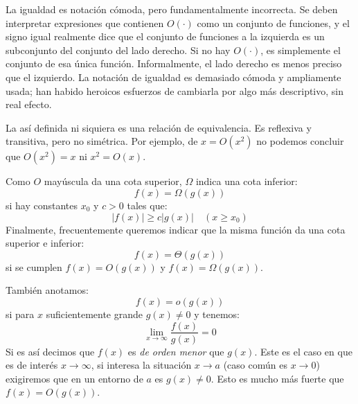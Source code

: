   La igualdad es notación cómoda,
  pero fundamentalmente incorrecta.
  Se deben interpretar expresiones que contienen \(O(\cdot)\)
  como un conjunto de funciones,
  y el signo igual
  realmente dice que el conjunto de funciones a la izquierda
  es un subconjunto del conjunto del lado derecho.
  Si no hay \(O(\cdot)\),
  es simplemente el conjunto de esa única función.
  Informalmente,
  el lado derecho es menos preciso que el izquierdo.
  La notación de igualdad es demasiado cómoda y ampliamente usada;
  han habido heroicos esfuerzos de cambiarla por algo más descriptivo,
  sin real efecto.

  La  así definida
  ni siquiera es una relación de equivalencia.
  Es reflexiva y transitiva,
  pero no simétrica.
  Por ejemplo,
  de \(x = O(x^2)\) no podemos concluir que \(O(x^2) = x\)
  ni \(x^2 = O(x)\).

  Como \(O\) mayúscula da una cota superior,
  \(\Omega\) indica una cota inferior:
  \begin{equation}
    \label{eq:big-omega}
    f(x)
      = \Omega(g(x))
  \end{equation}
  si hay constantes \(x_0\) y \(c > 0\) tales que:
  \begin{equation}
    \label{eq:big-omega-definitition}
    \lvert f(x) \rvert
      \ge c \lvert g(x) \rvert
      \quad (x \ge x_0)
  \end{equation}
  Finalmente,
  frecuentemente queremos indicar que la misma función
  da una cota superior e inferior:
  \begin{equation}
    \label{eq:big-theta}
    f(x)
      = \Theta(g(x))
  \end{equation}
  si se cumplen \(f(x) = O(g(x))\) y \(f(x) = \Omega(g(x))\).

  También anotamos:
  \begin{equation}
    \label{eq:small-oh}
    f(x)
      = o(g(x))
  \end{equation}
  si para \(x\) suficientemente grande \(g(x) \ne 0\)
  y tenemos:
  \begin{equation}
    \label{eq:small-oh-definition}
    \lim_{x \to \infty} \frac{f(x)}{g(x)}
      = 0
  \end{equation}
  Si es así decimos que \(f(x)\) es \emph{de orden menor} que \(g(x)\).
  Este es el caso en que es de interés \(x \to \infty\),
  si interesa la situación \(x \to a\)
  (caso común es \(x \to 0\))
  exigiremos que en un entorno de \(a\) es \(g(x) \ne 0\).
  Esto es mucho más fuerte que \(f(x) = O(g(x))\).

